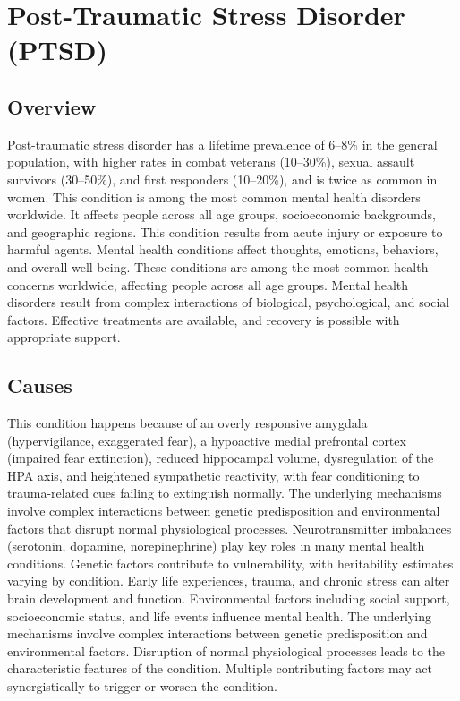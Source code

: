 \chapter{Post-Traumatic Stress Disorder (PTSD)}
\label{sec:Post-Traumatic Stress Disorder (PTSD)}

\section{Overview}
Post-traumatic stress disorder has a lifetime prevalence of 6--8\% in the general population, with higher rates in combat veterans (10--30\%), sexual assault survivors (30--50\%), and first responders (10--20\%), and is twice as common in women. This condition is among the most common mental health disorders worldwide. It affects people across all age groups, socioeconomic backgrounds, and geographic regions. This condition results from acute injury or exposure to harmful agents. Mental health conditions affect thoughts, emotions, behaviors, and overall well-being. These conditions are among the most common health concerns worldwide, affecting people across all age groups. Mental health disorders result from complex interactions of biological, psychological, and social factors. Effective treatments are available, and recovery is possible with appropriate support.
\section{Causes}
This condition happens because of an overly responsive amygdala (hypervigilance, exaggerated fear), a hypoactive medial prefrontal cortex (impaired fear extinction), reduced hippocampal volume, dysregulation of the HPA axis, and heightened sympathetic reactivity, with fear conditioning to trauma-related cues failing to extinguish normally. The underlying mechanisms involve complex interactions between genetic predisposition and environmental factors that disrupt normal physiological processes. Neurotransmitter imbalances (serotonin, dopamine, norepinephrine) play key roles in many mental health conditions. Genetic factors contribute to vulnerability, with heritability estimates varying by condition. Early life experiences, trauma, and chronic stress can alter brain development and function. Environmental factors including social support, socioeconomic status, and life events influence mental health. The underlying mechanisms involve complex interactions between genetic predisposition and environmental factors. Disruption of normal physiological processes leads to the characteristic features of the condition. Multiple contributing factors may act synergistically to trigger or worsen the condition.
